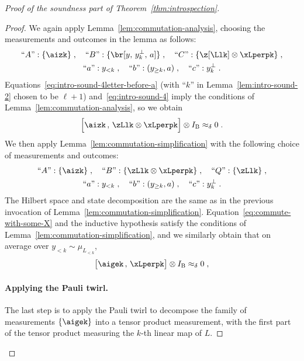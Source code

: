 \documentclass[11pt]{article}
\theoremstyle{definition}
\newcommand{\Id}{\ensuremath{I}}
\newcommand{\ib}{\Id_\bob}
\newcommand{\labelstyle}[1]{\ensuremath{\textsc{#1}}\xspace}
\newcommand{\bob}{\labelstyle{B}}
\begin{document}
\begin{proof}[Proof of the soundness part of Theorem~\ref{thm:introspection}]
\begin{proof}
    We again apply Lemma~\ref{lem:commutation-analysis}, choosing the
    measurements and outcomes in the lemma as follows:
    \begin{gather*}
      \text{``$A$''}: \{\aizk\}\;,\quad
      \text{``$B$''}: \{ \br[y,\, y^\perp_k,\, a] \}\;,\quad
      \text{``$C$''}: \{ \z[\Llk] \otimes \xLperpk \}\;, \\
      \text{``$a$''}: y_{< k} \;, \quad
      \text{``$b$''}: (y_{\geq k},a) \;, \quad
      \text{``$c$''}: y_k^\perp \;.
    \end{gather*}
    Equations~\eqref{eq:intro-sound-4letter-before-a} (with ``$k$'' in
    Lemma~\ref{lem:intro-sound-2} chosen to be $\ell+1$)
    and~\eqref{eq:intro-sound-4} imply the conditions of
    Lemma~\ref{lem:commutation-analysis}, so we obtain
    \begin{equation}\label{eq:commute-with-some-X}
      \Bigl[ \aizk \,,\,  \zLlk \otimes \xLperpk \Bigr] \otimes
      \ib \approx_\delta 0\;.
    \end{equation}
    We then apply Lemma~\ref{lem:commutation-simplification} with the following
    choice of measurements and outcomes:
    \begin{gather*}
      \text{``$A$''}: \{\aizk\}\;,\quad
      \text{``$B$''}: \{\zLlk \otimes \xLperpk \}\;, \quad
      \text{``$Q$''}: \{\zLlk \}\;, \\
      \text{``$a$''}: y_{< k} \;, \quad
      \text{``$b$''}: (y_{\geq k},a) \;, \quad
      \text{``$c$''}: y_k^\perp \;.
    \end{gather*}
    The Hilbert space and state decomposition are the same as in the previous
    invocation of Lemma~\ref{lem:commutation-simplification}.
    Equation~\eqref{eq:commute-with-some-X} and the inductive hypothesis satisfy
    the conditions of Lemma~\ref{lem:commutation-simplification}, and we
    similarly obtain that on average over $y_{< k} \sim \mu_{L_{<k}}$,
    \begin{equation}
      \label{eq:intro-sound-6}
      \bigl[ \aigek \,,\, \xLperpk \bigr] \otimes \ib
      \approx_\delta 0\;,
    \end{equation}

    \paragraph{Applying the Pauli twirl.}
    The last step is to apply the Pauli twirl to decompose the family of
    measurements $\{\aigek \}$ into a tensor product measurement, with the first
    part of the tensor product measuring the $k$-th linear map of $L$.


\end{proof}
\end{proof}
\end{document}
